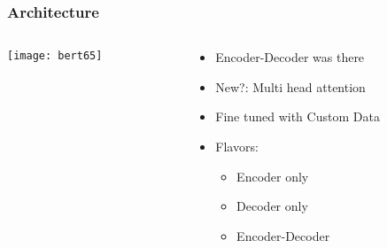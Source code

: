 \begin{frame}[fragile]\frametitle{Architecture}

\begin{columns}
    \begin{column}[T]{0.5\linewidth}
			\begin{center}
			\texttt{[image: bert65]}
			\end{center}		
		\end{column}
    \begin{column}[T]{0.5\linewidth}
      \begin{itemize}
			\item Encoder-Decoder was there
			\item New?: Multi head attention
			\item Fine tuned with Custom Data
			\item Flavors:
      \begin{itemize}
			\item Encoder only
			\item Decoder only
			\item Encoder-Decoder
			\end{itemize}
			\end{itemize}
    \end{column}
  \end{columns}
			
\end{frame}



			
